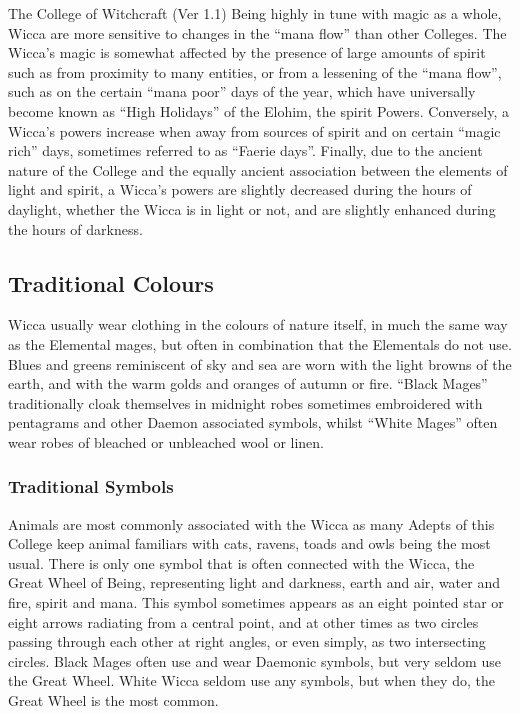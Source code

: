 \begin{Chapter}{The College of Witchcraft (Ver 1.1)}
Being highly in tune with magic as a whole, Wicca are more sensitive
to changes in the “mana flow” than other Colleges.  The Wicca’s magic
is somewhat affected by the presence of large amounts of spirit such
as from proximity to many entities, or from a lessening of the “mana
flow”, such as on the certain “mana poor” days of the year, which have
universally become known as “High Holidays” of the Elohim, the spirit
Powers. Conversely, a Wicca’s powers increase when away from sources
of spirit and on certain “magic rich” days, sometimes referred to as
“Faerie days”.  Finally, due to the ancient nature of the College and
the equally ancient association between the elements of light and
spirit, a Wicca’s powers are slightly decreased during the hours of
daylight, whether the Wicca is in light or not, and are slightly
enhanced during the hours of darkness.

\subsection{Traditional Colours}

Wicca usually wear clothing in the colours of nature itself, in much
the same way as the Elemental mages, but often in combination that the
Elementals do not use.  Blues and greens reminiscent of sky and sea
are worn with the light browns of the earth, and with the warm golds
and oranges of autumn or fire.  “Black Mages” traditionally cloak
themselves in midnight robes sometimes embroidered with pentagrams and
other Daemon associated symbols, whilst “White Mages” often wear robes
of bleached or unbleached wool or linen.

\subsubsection{Traditional Symbols}

Animals are most commonly associated with the Wicca as many Adepts of
this College keep animal familiars with cats, ravens, toads and owls
being the most usual.  There is only one symbol that is often
connected with the Wicca, the Great Wheel of Being, representing light
and darkness, earth and air, water and fire, spirit and mana.  This
symbol sometimes appears as an eight pointed star or eight arrows
radiating from a central point, and at other times as two circles
passing through each other at right angles, or even simply, as two
intersecting circles. Black Mages often use and wear Daemonic symbols,
but very seldom use the Great Wheel.  White Wicca seldom use any
symbols, but when they do, the Great Wheel is the most common.



\end{Chapter}
